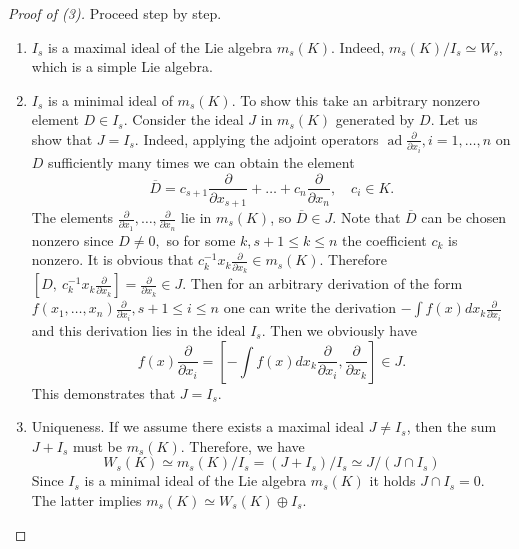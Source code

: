 \documentclass[12pt,a4paper]{amsart}
\theoremstyle{plain}
\theoremstyle{definition}
\DeclareMathOperator{\ad}{ad}
\begin{document}
\begin{proof}[Proof of (3)]
	Proceed step by step.
	\begin{enumerate}
		\item $I_s$ is a maximal ideal of the Lie algebra $m_s(K) $.
		Indeed, $m_s(K) / I_s \simeq W_s$, which is a simple Lie algebra.
		
		\item $I_s$ is a minimal ideal of $ m_s(K).$ To show this 
take an arbitrary nonzero element $D \in I_{s}$. Consider the ideal $J$ in $m_{s}(K)$ generated by $D$. Let us  show that ${J} = I_{s}$. Indeed, applying the  adjoint operators $\ad \frac{\partial}{\partial x_{i}}, i=1, \ldots , n$ on $D$ sufficiently many times we can obtain the element
\begin{equation*}
	\overline{D} = c_{s+1} \frac{\partial}{\partial x_{s+1}} + \dots + c_{n} \frac{\partial}{\partial x_{n}}, \quad c_{i} \in K.
\end{equation*}
The elements  $\frac{\partial}{\partial x_{1}}, \dots, \frac{\partial}{\partial x_{n}}$ lie in $ m_{s}(K)$, so  $\overline{D} \in {J}$.  Note that $\overline{D} $ can be chosen nonzero since $ D\not =0,$  so for some $k, s+1\leq k\leq n $ the coefficient $c_k$ is nonzero. It is obvious that $c_k^{-1}x_k\frac{\partial}{\partial x_k}\in m_s(K). $ Therefore $[D, \  c_k^{-1}x_k\frac{\partial}{\partial x_k}]=\frac{\partial}{\partial x_k}\in J.$
 Then for an arbitrary derivation of the form $f(x_1, \ldots , x_n)\frac{\partial}{\partial x_{i}}, s+1\leq i\leq n$  one can write the derivation $-\int f(x) dx_{k} \frac{\partial}{\partial x_{i}}$  and this derivation lies in  the ideal $I_s.$ Then we obviously have
\begin{equation*}
	f(x) \frac{\partial}{\partial x_{i}} = \left[ -\int f(x) dx_{k} \frac{\partial}{\partial x_{i}}, \frac{\partial}{\partial x_{k}} \right] \in {J}.
\end{equation*}
This demonstrates that ${J} = I_{s}$.
	\item Uniqueness.
	If we assume there exists a maximal ideal ${J} \neq I_{s}$, then the sum ${J} + I_{s}$ must be $m_{s}(K)$. Therefore, we have
\begin{equation*}
	W_{s}(K) \simeq m_{s}(K) / I_{s} = ({J} + I_{s}) / I_{s} \simeq {J} / ({J} \cap I_{s})
\end{equation*}
Since $I_{s}$ is a minimal ideal of the Lie algebra $m_s(K)$ it holds  ${J} \cap I_{s} = 0.$ The latter   implies $m_{s}(K) \simeq W_{s}(K) \oplus I_{s}$. 


\end{enumerate}
\end{proof}
\end{document}
